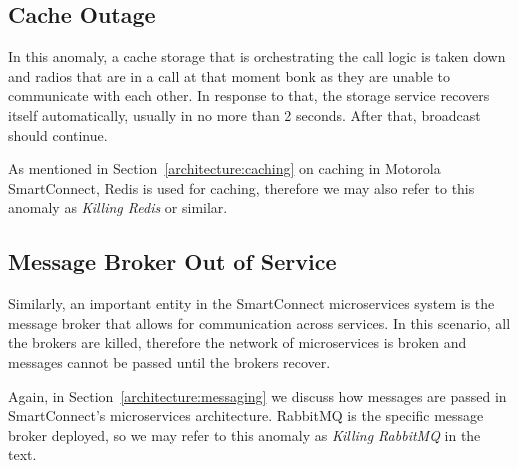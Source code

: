 \subsection{Cache Outage}
In this anomaly, a cache storage that is orchestrating the call logic is taken down and radios that are in a call at that moment bonk as they are unable to communicate with each other.
In response to that, the storage service recovers itself automatically, usually in no more than 2 seconds. After that, broadcast should continue.

As mentioned in Section~\ref{architecture:caching} on caching in Motorola SmartConnect, Redis is used for caching, therefore we may also refer to this anomaly as \textit{Killing Redis} or similar.


\subsection{Message Broker Out of Service}
Similarly, an important entity in the SmartConnect microservices system is the message broker that allows for communication across services. In this scenario, all the brokers are killed, therefore the network of microservices is broken and messages cannot be passed until the brokers recover.

Again, in Section~\ref{architecture:messaging} we discuss how messages are passed in SmartConnect's microservices architecture. RabbitMQ is the specific message broker deployed, so we may refer to this anomaly as \textit{Killing RabbitMQ} in the text.

